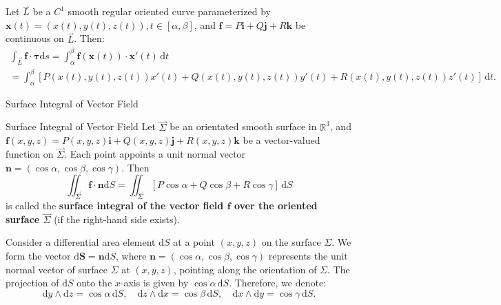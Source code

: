 \documentclass[11pt]{../../TexTemplate/elegantbook}
\begin{document}
\begin{theorem}
    Let \(\overset{\rightharpoonup}{L}\) be a \(C^{1}\) smooth regular oriented curve parameterized by 
    \(\mathbf{x}(t) = (x(t), y(t), z(t)), t \in [\alpha, \beta]\),
    and \(\mathbf{f} = P\mathbf{i} + Q\mathbf{j} + R\mathbf{k}\) be continuous on \(\overset{\rightharpoonup}{L}\).
    Then:
    \begin{gather*}
    \int_{\overset{\rightharpoonup}{L}} \mathbf{f} \cdot \boldsymbol{\tau} \mathrm{d}s =
    \int_{\alpha}^{\beta} \mathbf{f}(\mathbf{x}(t)) \cdot \mathbf{x}'(t) \, \mathrm{d}t \\
    = \int_{\alpha}^{\beta} [P(x(t), y(t), z(t)) x'(t) + Q(x(t), y(t), z(t)) y'(t) + R(x(t), y(t), z(t)) z'(t)] \, \mathrm{d}t.
    \end{gather*}
\end{theorem}
\begin{leftbarTitle}{Surface Integral of Vector Field}\end{leftbarTitle}
\begin{definition}{Surface Integral of Vector Field}
    Let \(\overset{\rightharpoonup}{\Sigma}\) be an orientated smooth surface in \(\mathbb{R}^3\),
    and \(\mathbf{f}(x, y, z) = P(x, y, z)\mathbf{i} + Q(x, y, z)\mathbf{j} + R(x, y, z)\mathbf{k}\) 
    be a vector-valued function on \(\overset{\rightharpoonup}{\Sigma}\).
    Each point appoints a unit normal vector \(\mathbf{n}=(\cos\alpha, \cos\beta, \cos\gamma)\).
    Then 
    \[
    \iint_{\overset{\rightharpoonup}{\Sigma}} \mathbf{f} \cdot \mathbf{n} \mathrm{d}S =
    \iint_{\overset{\rightharpoonup}{\Sigma}} \left[P \cos\alpha + Q \cos\beta + R \cos\gamma\right] \, \mathrm{d}S
    \]
    is called the \textbf{surface integral of the vector field \(\mathbf{f}\) over the oriented surface \(\overset{\rightharpoonup}{\Sigma}\)}
    (if the right-hand side exists).
\end{definition}
Consider a differential area element \( \mathrm{d}S \) at a point \((x, y, z)\) on the surface \( \Sigma \). 
We form the vector \( \mathrm{d}\mathbf{S} = \mathbf{n} \mathrm{d}S \), 
where \( \mathbf{n} = (\cos\alpha, \cos\beta, \cos\gamma) \) represents
the unit normal vector of surface \( \Sigma \) at \((x, y, z)\),
pointing along the orientation of \( \Sigma \).
The projection of \( \mathrm{d}S \) onto the \( x \)-axis is given by \(\cos\alpha \, \mathbf{\mathrm{d}}S\). 
Therefore, we denote:
\[
\mathrm{d}y \wedge \mathrm{d}z = \cos\alpha \, \mathrm{d}S, \quad \mathrm{d}z \wedge \mathrm{d}x = \cos\beta \, \mathrm{d}S, \quad 
\mathrm{d}x \wedge \mathrm{d}y = \cos\gamma \, \mathrm{d}S.
\]
\end{document}
